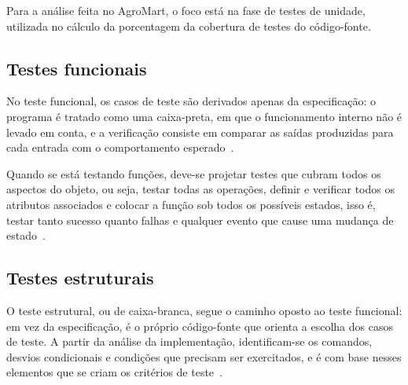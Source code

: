Para a análise feita no AgroMart, o foco está na fase de testes de unidade, utilizada no cálculo da porcentagem da cobertura de testes do código-fonte.

\subsection{Testes funcionais}

No teste funcional, os casos de teste são derivados apenas da especificação: o programa é tratado como uma caixa-preta,
em que o funcionamento interno não é levado em conta, e a verificação consiste em comparar as saídas produzidas para cada entrada com o comportamento esperado~\cite{delamaro2007}.


Quando se está testando funções, deve-se projetar testes que cubram todos os aspectos do objeto, ou seja, testar todas as operações,
definir e verificar todos os atributos associados e colocar a função sob todos os possíveis estados, isso é, testar tanto sucesso quanto falhas e qualquer evento que cause uma mudança de estado~\cite{sommerville2011software}.

\subsection{Testes estruturais}

O teste estrutural, ou de caixa-branca, segue o caminho oposto ao teste funcional: em vez da especificação, é o próprio código-fonte que orienta a escolha dos casos de teste.
A partir da análise da implementação, identificam-se os comandos, desvios condicionais e condições que precisam ser exercitados, e é com base nesses elementos que se criam os critérios de teste~\cite{delamaro2007}.


